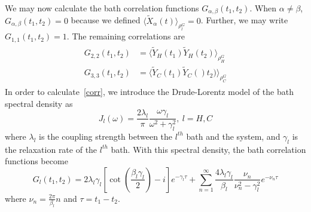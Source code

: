 \documentclass[aps, prl, preprint]{revtex4-1}
\newcommand{\til}[1]{\widetilde{#1}}
\newcommand{\ave}[2]{\langle #1\rangle_{#2}}
\begin{document}
We may now calculate the bath correlation functions $G_{\alpha,\beta}(t_1,t_2)$. When $\alpha\neq\beta$, $G_{\alpha,\beta}(t_1,t_2)=0$ because we defined $\ave{\til{X}_{\alpha}(t)}{\rho_l^G}=0$. Further, we may write $G_{1,1}(t_1,t_2) = 1$. The remaining correlations are
\begin{align}\label{corr}
\begin{split}
G_{2,2}(t_1,t_2) &= \ave{\til{Y}_H(t_1)\til{Y}_H(t_2)}{\rho_H^G}\\
G_{3,3}(t_1,t_2) &= \ave{\til{Y}_C(t_1)\til{Y}_C()t_2)}{\rho_C^G}
\end{split}
\end{align}
In order to calculate~\ref{corr}, we introduce the Drude-Lorentz model of the bath spectral density as
\begin{equation}\label{drude}
J_l(\omega) = \frac{2\lambda_l}{\pi}\frac{\omega\gamma_l}{\omega^2+\gamma_l^2},\ l=H,C
\end{equation}
where $\lambda_l$ is the coupling strength between the $l^{th}$ bath and the system, and $\gamma_l$ is the relaxation rate of the $l^{th}$ bath. With this spectral density, the bath correlation functions become
\begin{equation}\label{bathdrude}
G_l(t_1,t_2) = 2\lambda_l\gamma_l\left[\cot(\frac{\beta_l\gamma_l}{2}) -i\right]e^{-\gamma_l\tau} + \sum_{n=1}^{\infty} \frac{4\lambda_l\gamma_l}{\beta_l}\frac{\nu_n}{\nu_n^2-\gamma_l^2}e^{-\nu_n\tau}
\end{equation}
where $\nu_n = \frac{2\pi}{\beta_l}n$ and $\tau = t_1-t_2$.
\end{document}

